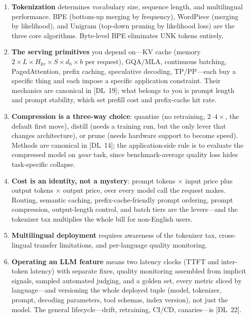 \begin{enumerate}
    \item \textbf{Tokenization} determines vocabulary size, sequence length, and
          multilingual performance.  BPE (bottom-up merging by frequency), WordPiece
          (merging by likelihood), and Unigram (top-down pruning by likelihood loss)
          are the three core algorithms.  Byte-level BPE eliminates UNK tokens entirely.

    \item \textbf{The serving primitives} you depend on---KV cache (memory
          $2 \times L \times H_{\text{kv}} \times S \times d_h \times b$ per request),
          GQA/MLA, continuous batching, PagedAttention, prefix caching, speculative
          decoding, TP/PP---each buy a specific thing and each impose a specific
          application constraint.  Their mechanics are canonical in [DL~19];
          what belongs to you is prompt length and prompt stability, which set
          prefill cost and prefix-cache hit rate.

    \item \textbf{Compression is a three-way choice}: quantize (no retraining,
          $2$--$4\times$, the default first move), distill (needs a training run, but
          the only lever that changes architecture), or prune (needs hardware support
          to become speed).  Methods are canonical in [DL~14]; the application-side
          rule is to evaluate the compressed model on \emph{your} task, since
          benchmark-average quality loss hides task-specific collapse.

    \item \textbf{Cost is an identity, not a mystery}: prompt tokens $\times$ input
          price plus output tokens $\times$ output price, over every model call the
          request makes.  Routing, semantic caching, prefix-cache-friendly prompt
          ordering, prompt compression, output-length control, and batch tiers are the
          levers---and the tokenizer tax multiplies the whole bill for non-English users.

    \item \textbf{Multilingual deployment} requires awareness of the tokenizer tax,
          cross-lingual transfer limitations, and per-language quality monitoring.

    \item \textbf{Operating an LLM feature} means two latency clocks (TTFT and
          inter-token latency) with separate fixes, quality monitoring assembled from
          implicit signals, sampled automated judging, and a golden set, every metric
          sliced by language---and versioning the whole deployed tuple (model, tokenizer,
          prompt, decoding parameters, tool schemas, index version), not just the model.
          The general lifecycle---drift, retraining, CI/CD, canaries---is [DL~22].
\end{enumerate}

